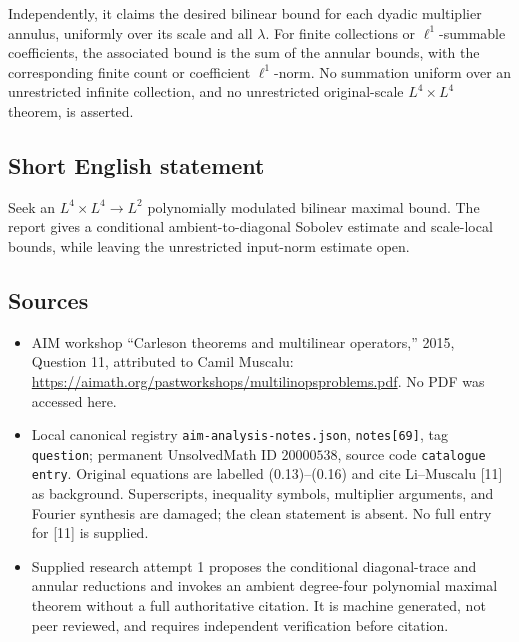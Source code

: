 \documentclass[11pt]{article}
\begin{document}
Independently, it claims the desired bilinear bound for each dyadic multiplier annulus, uniformly over its scale and all \(\lambda\). For finite collections or \(\ell^1\)-summable coefficients, the associated bound is the sum of the annular bounds, with the corresponding finite count or coefficient \(\ell^1\)-norm. No summation uniform over an unrestricted infinite collection, and no unrestricted original-scale \(L^4\times L^4\) theorem, is asserted.
\subsection{Short English statement}
Seek an \(L^4\times L^4\to L^2\) polynomially modulated bilinear maximal bound. The report gives a conditional ambient-to-diagonal Sobolev estimate and scale-local bounds, while leaving the unrestricted input-norm estimate open.
\subsection{Sources}
\begin{itemize}
\item AIM workshop ``Carleson theorems and multilinear operators,'' 2015, Question 11, attributed to Camil Muscalu: \url{https://aimath.org/pastworkshops/multilinopsproblems.pdf}. No PDF was accessed here.
\item Local canonical registry \texttt{aim-analysis-notes.json}, \texttt{notes[69]}, tag \texttt{question}; permanent UnsolvedMath ID \(20000538\), source code \texttt{catalogue entry}. Original equations are labelled (0.13)--(0.16) and cite Li--Muscalu [11] as background. Superscripts, inequality symbols, multiplier arguments, and Fourier synthesis are damaged; the clean statement is absent. No full entry for [11] is supplied.
\item Supplied research attempt 1 proposes the conditional diagonal-trace and annular reductions and invokes an ambient degree-four polynomial maximal theorem without a full authoritative citation. It is machine generated, not peer reviewed, and requires independent verification before citation.
\end{itemize}
\end{document}
